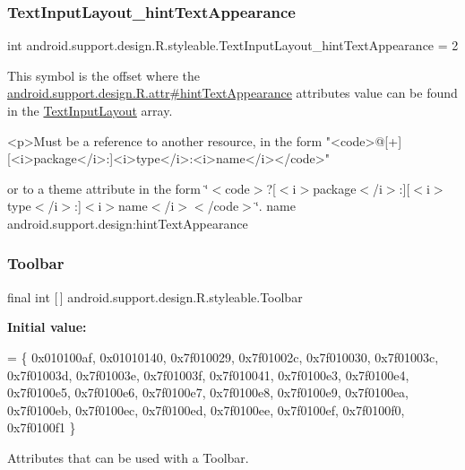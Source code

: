 \subsubsection{\texorpdfstring{Text\+Input\+Layout\+\_\+hint\+Text\+Appearance}{TextInputLayout\_hintTextAppearance}}
{\footnotesize\ttfamily int android.\+support.\+design.\+R.\+styleable.\+Text\+Input\+Layout\+\_\+hint\+Text\+Appearance = 2\hspace{0.3cm}{\ttfamily [static]}}

This symbol is the offset where the \hyperlink{classandroid_1_1support_1_1design_1_1R_1_1attr_a8c3c8800b2a920626f8ebd3de5dd34b3}{android.\+support.\+design.\+R.\+attr\#hint\+Text\+Appearance} attribute\textquotesingle{}s value can be found in the \hyperlink{classandroid_1_1support_1_1design_1_1R_1_1styleable_ae01fd2fce65dc8639f3898586b0cedcf}{Text\+Input\+Layout} array.

\begin{DoxyVerb}      <p>Must be a reference to another resource, in the form "<code>@[+][<i>package</i>:]<i>type</i>:<i>name</i></code>"
\end{DoxyVerb}
 or to a theme attribute in the form \char`\"{}$<$code$>$?\mbox{[}$<$i$>$package$<$/i$>$\+:\mbox{]}\mbox{[}$<$i$>$type$<$/i$>$\+:\mbox{]}$<$i$>$name$<$/i$>$$<$/code$>$\char`\"{}.  name android.\+support.\+design\+:hint\+Text\+Appearance \mbox{\label{classandroid_1_1support_1_1design_1_1R_1_1styleable_a7783ebe780dbe2a845802a40519a46e9}} 
\subsubsection{\texorpdfstring{Toolbar}{Toolbar}}
{\footnotesize\ttfamily final int \mbox{[}$\,$\mbox{]} android.\+support.\+design.\+R.\+styleable.\+Toolbar\hspace{0.3cm}{\ttfamily [static]}}

{\bfseries Initial value\+:}
\begin{DoxyCode}
= \{
            0x010100af, 0x01010140, 0x7f010029, 0x7f01002c,
            0x7f010030, 0x7f01003c, 0x7f01003d, 0x7f01003e,
            0x7f01003f, 0x7f010041, 0x7f0100e3, 0x7f0100e4,
            0x7f0100e5, 0x7f0100e6, 0x7f0100e7, 0x7f0100e8,
            0x7f0100e9, 0x7f0100ea, 0x7f0100eb, 0x7f0100ec,
            0x7f0100ed, 0x7f0100ee, 0x7f0100ef, 0x7f0100f0,
            0x7f0100f1
        \}
\end{DoxyCode}
Attributes that can be used with a Toolbar. 

